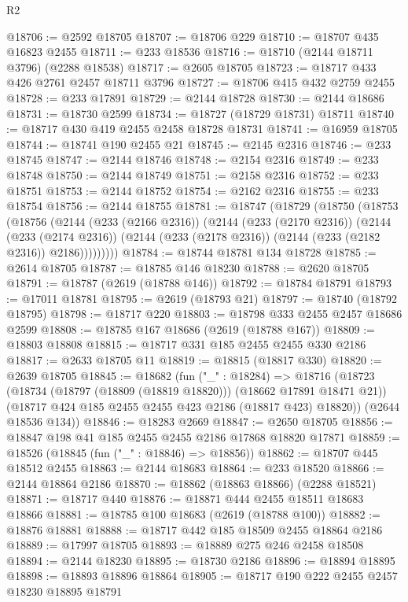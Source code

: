 \begin{lexlean}{R2}
\begin{coremodule}
@18706 := @2592 @18705
@18707 := @18706 @229
@18710 := @18707 @435 @16823 @2455
@18711 := @233 @18536
@18716 := @18710 (@2144 @18711 @3796) (@2288 @18538)
@18717 := @2605 @18705
@18723 := @18717 @433 @426 @2761 @2457 @18711 @3796
@18727 := @18706 @415 @432 @2759 @2455
@18728 := @233 @17891
@18729 := @2144 @18728
@18730 := @2144 @18686
@18731 := @18730 @2599
@18734 := @18727 (@18729 @18731) @18711
@18740 := @18717 @430 @419 @2455 @2458 @18728 @18731
@18741 := @16959 @18705
@18744 := @18741 @190 @2455 @21
@18745 := @2145 @2316
@18746 := @233 @18745
@18747 := @2144 @18746
@18748 := @2154 @2316
@18749 := @233 @18748
@18750 := @2144 @18749
@18751 := @2158 @2316
@18752 := @233 @18751
@18753 := @2144 @18752
@18754 := @2162 @2316
@18755 := @233 @18754
@18756 := @2144 @18755
@18781 := @18747
    (@18729
      (@18750
        (@18753
          (@18756
            (@2144
              (@233 (@2166 @2316))
              (@2144
                (@233 (@2170 @2316))
                (@2144
                  (@233 (@2174 @2316))
                  (@2144 (@233 (@2178 @2316)) (@2144 (@233 (@2182 @2316)) @2186)))))))))
@18784 := @18744 @18781 @134 @18728
@18785 := @2614 @18705
@18787 := @18785 @146 @18230
@18788 := @2620 @18705
@18791 := @18787 (@2619 (@18788 @146))
@18792 := @18784 @18791
@18793 := @17011 @18781
@18795 := @2619 (@18793 @21)
@18797 := @18740 (@18792 @18795)
@18798 := @18717 @220
@18803 := @18798 @333 @2455 @2457 @18686 @2599
@18808 := @18785 @167 @18686 (@2619 (@18788 @167))
@18809 := @18803 @18808
@18815 := @18717 @331 @185 @2455 @2455 @330 @2186
@18817 := @2633 @18705 @11
@18819 := @18815 (@18817 @330)
@18820 := @2639 @18705
@18845 := @18682
    (fun ("_" : @18284) =>
    @18716
      (@18723
        (@18734 (@18797 (@18809 (@18819 @18820))) (@18662 @17891 @18471 @21))
        (@18717 @424 @185 @2455 @2455 @423 @2186 (@18817 @423) @18820))
      (@2644 @18536 @134))
@18846 := @18283 @2669
@18847 := @2650 @18705
@18856 := @18847 @198 @41 @185 @2455 @2455 @2186 @17868 @18820 @17871
@18859 := @18526 (@18845 (fun ("_" : @18846) => @18856))
@18862 := @18707 @445 @18512 @2455
@18863 := @2144 @18683
@18864 := @233 @18520
@18866 := @2144 @18864 @2186
@18870 := @18862 (@18863 @18866) (@2288 @18521)
@18871 := @18717 @440
@18876 := @18871 @444 @2455 @18511 @18683 @18866
@18881 := @18785 @100 @18683 (@2619 (@18788 @100))
@18882 := @18876 @18881
@18888 := @18717 @442 @185 @18509 @2455 @18864 @2186
@18889 := @17997 @18705
@18893 := @18889 @275 @246 @2458 @18508
@18894 := @2144 @18230
@18895 := @18730 @2186
@18896 := @18894 @18895
@18898 := @18893 @18896 @18864
@18905 := @18717 @190 @222 @2455 @2457 @18230 @18895 @18791

\end{coremodule}
\end{lexlean}
